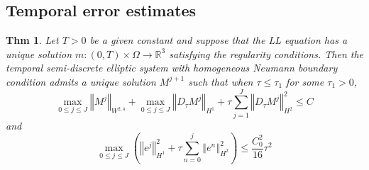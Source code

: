 \documentclass[UTF8,a4paper]{article}
\newtheorem{Theorem}{Thm}[section]
\begin{document}
\subsection{Temporal error estimates}
\begin{Theorem}
  Let $T>0$ be a given constant and suppose that the LL equation has a unique solution $m:(0,T)\times\Omega\to \mathbb{R}^3$ satisfying the regularity conditions. Then the temporal semi-discrete elliptic system with homogeneous Neumann boundary condition admits a unique solution $M^{j+1}$ such that when $\tau\leq\tau_1$ for some $\tau_1>0$, 
\begin{equation*}
\max_{0\leq j\leq J}\left\Vert M^j\right\Vert_{W^{2,4}}+\max_{0\leq j\leq J}\left\Vert D_{\tau}M^j\right\Vert_{H^1}+\tau\sum_{j=1}^J \left\Vert D_{\tau}M^j\right\Vert_{H^2}^2\leq C
\end{equation*}
and
\begin{equation*}
\max_{0\leq j\leq J}\left( \left\Vert e^j\right\Vert_{H^1}^2+\tau\sum_{n=0}^j \left\Vert e^n\right\Vert _{H^2}^2\right)\leq \frac{C_0^2}{16}\tau^2
\end{equation*}
\end{Theorem}
\end{document}
